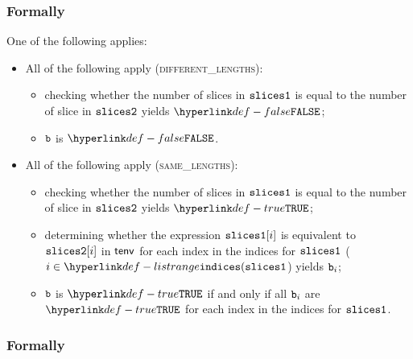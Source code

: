 \subsubsection{Formally}
One of the following applies:
\begin{itemize}
  \item All of the following apply (\textsc{different\_lengths}):
  \begin{itemize}
    \item checking whether the number of slices in $\texttt{slices1}$ is equal to the number of slice in $\texttt{slices2}$ yields $\False$;
    \item $\texttt{b}$ is $\False$.
  \end{itemize}

  \item All of the following apply (\textsc{same\_lengths}):
  \begin{itemize}
    \item checking whether the number of slices in $\texttt{slices1}$ is equal to the number of slice in $\texttt{slices2}$ yields $\True$;
    \item determining whether the expression $\texttt{slices1}[i]$ is equivalent to $\texttt{slices2}[i]$ in $\textsf{tenv}$
          for each index in the indices for $\texttt{slices1}$ ($i \in \listrange(\slicesone$) yields $\texttt{b}_i$\ProseOrTypeError;
    \item $\texttt{b}$ is $\True$ if and only if all $\texttt{b}_i$ are $\True$ for each index in the indices for $\texttt{slices1}$.
  \end{itemize}
\end{itemize}

\subsubsection{Formally}

